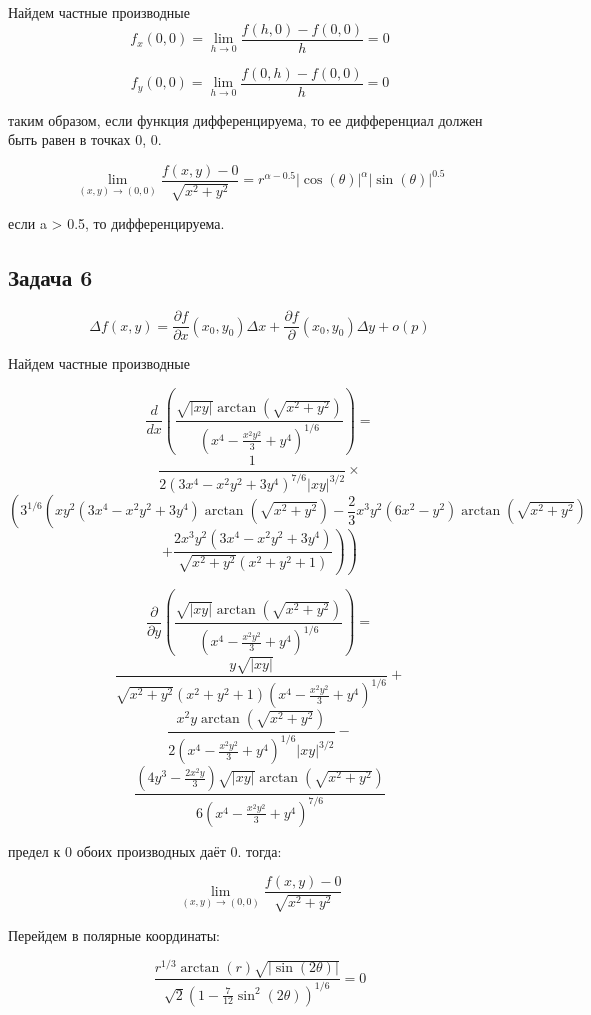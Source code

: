 \documentclass[a4paper,12pt]{article}
\begin{document}
Найдем частные производные
\[
f_x(0, 0) = \lim_{h \to 0} \frac{f(h, 0)-f(0, 0)}{h} = 0
\]

\[
f_y(0, 0) = \lim_{h \to 0} \frac{f(0, h)-f(0, 0)}{h} = 0
\]

таким образом, если функция дифференцируема, то ее дифференциал должен быть равен в точках 0, 0.

\[
\lim_{(x, y) \to (0, 0)} \frac{f(x, y)-0}{\sqrt{x^2+y^2}} = r^{\alpha-0.5}|\cos(\theta)|^\alpha|\sin(\theta)|^{0.5}
\]

если a > 0.5, то дифференцируема.

\subsection{Задача 6}

\[
\Delta f(x, y) = \frac{\partial f}{\partial x}(x_0, y_0)\Delta x + \frac{\partial f}{\partial }(x_0, y_0)\Delta y + o(p)
\]

Найдем частные производные

\[
\frac{d}{dx}\left(\frac{\sqrt{|xy|} \arctan\left(\sqrt{x^2 + y^2}\right)}{\left(x^4 - \frac{x^2 y^2}{3} + y^4\right)^{1/6}}\right) =
\]
\[
\frac{1}{2 \left(3 x^4 - x^2 y^2 + 3 y^4\right)^{7/6} |xy|^{3/2}} \times
\]
\[
\left( 3^{1/6} \left(x y^2 \left(3 x^4 - x^2 y^2 + 3 y^4\right) \arctan\left(\sqrt{x^2 + y^2}\right) - \frac{2}{3} x^3 y^2 \left(6 x^2 - y^2\right) \arctan\left(\sqrt{x^2 + y^2}\right) \right. \right.
\]
\[
\left. \left. + \frac{2 x^3 y^2 \left(3 x^4 - x^2 y^2 + 3 y^4\right)}{\sqrt{x^2 + y^2} \left(x^2 + y^2 + 1\right)} \right) \right)
\]

\[
\frac{\partial}{\partial y}\left(\frac{\sqrt{|xy|} \arctan\left(\sqrt{x^2 + y^2}\right)}{\left(x^4 - \frac{x^2 y^2}{3} + y^4\right)^{1/6}}\right) =
\]
\[
\frac{y \sqrt{|xy|}}{\sqrt{x^2 + y^2} \left(x^2 + y^2 + 1\right) \left(x^4 - \frac{x^2 y^2}{3} + y^4\right)^{1/6}} +
\]
\[
\frac{x^2 y \arctan\left(\sqrt{x^2 + y^2}\right)}{2 \left(x^4 - \frac{x^2 y^2}{3} + y^4\right)^{1/6} |xy|^{3/2}} -
\]
\[
\frac{\left(4 y^3 - \frac{2 x^2 y}{3}\right) \sqrt{|xy|} \arctan\left(\sqrt{x^2 + y^2}\right)}{6 \left(x^4 - \frac{x^2 y^2}{3} + y^4\right)^{7/6}}
\]

предел к 0 обоих производных даёт 0. тогда:

\[
\lim_{(x, y) \to (0, 0)} \frac{f(x, y)-0}{\sqrt{x^2+y^2}}
\]

Перейдем в полярные координаты:

\[
\frac{r^{1/3} \arctan(r) \sqrt{|\sin(2\theta)|}}{\sqrt{2} \left(1 - \frac{7}{12} \sin^2(2\theta)\right)^{1/6}} = 0
\]
\end{document}
